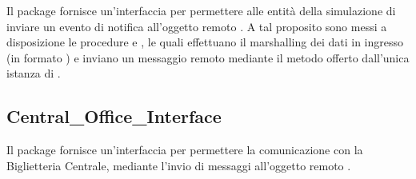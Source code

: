 	Il package  fornisce un'interfaccia per permettere alle entità della simulazione di inviare un evento di notifica all'oggetto remoto . A tal proposito sono messi a disposizione le procedure  e , le quali effettuano il marshalling dei dati in ingresso (in formato ) e inviano un messaggio remoto mediante il metodo  offerto dall'unica istanza di .
	
	\subsection{Central\_Office\_Interface}
	
	Il package  fornisce un'interfaccia per permettere la comunicazione con la Biglietteria Centrale, mediante l'invio di messaggi all'oggetto remoto .
	
